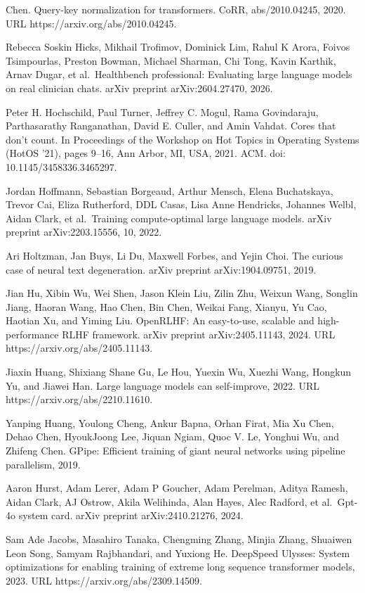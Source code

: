 Chen. Query-key normalization for transformers. CoRR, abs/2010.04245,
2020. URL https://arxiv.org/abs/2010.04245.

Rebecca Soskin Hicks, Mikhail Trofimov, Dominick Lim, Rahul K Arora,
Foivos Tsimpourlas, Preston Bowman, Michael Sharman, Chi Tong, Kavin
Karthik, Arnav Dugar, et al.~Healthbench professional: Evaluating large
language models on real clinician chats. arXiv preprint
arXiv:2604.27470, 2026.

Peter H. Hochschild, Paul Turner, Jeffrey C. Mogul, Rama Govindaraju,
Parthasarathy Ranganathan, David E. Culler, and Amin Vahdat. Cores that
don't count. In Proceedings of the Workshop on Hot Topics in Operating
Systems (HotOS '21), pages 9--16, Ann Arbor, MI, USA, 2021. ACM. doi:
10.1145/3458336.3465297.

Jordan Hoffmann, Sebastian Borgeaud, Arthur Mensch, Elena Buchatskaya,
Trevor Cai, Eliza Rutherford, DDL Casas, Lisa Anne Hendricks, Johannes
Welbl, Aidan Clark, et al.~Training compute-optimal large language
models. arXiv preprint arXiv:2203.15556, 10, 2022.

Ari Holtzman, Jan Buys, Li Du, Maxwell Forbes, and Yejin Choi. The
curious case of neural text degeneration. arXiv preprint
arXiv:1904.09751, 2019.

Jian Hu, Xibin Wu, Wei Shen, Jason Klein Liu, Zilin Zhu, Weixun Wang,
Songlin Jiang, Haoran Wang, Hao Chen, Bin Chen, Weikai Fang, Xianyu, Yu
Cao, Haotian Xu, and Yiming Liu. OpenRLHF: An easy-to-use, scalable and
high-performance RLHF framework. arXiv preprint arXiv:2405.11143, 2024.
URL https://arxiv.org/abs/2405.11143.



Jiaxin Huang, Shixiang Shane Gu, Le Hou, Yuexin Wu, Xuezhi Wang, Hongkun
Yu, and Jiawei Han. Large language models can self-improve, 2022. URL
https://arxiv.org/abs/2210.11610.

Yanping Huang, Youlong Cheng, Ankur Bapna, Orhan Firat, Mia Xu Chen,
Dehao Chen, HyoukJoong Lee, Jiquan Ngiam, Quoc V. Le, Yonghui Wu, and
Zhifeng Chen. GPipe: Efficient training of giant neural networks using
pipeline parallelism, 2019.

Aaron Hurst, Adam Lerer, Adam P Goucher, Adam Perelman, Aditya Ramesh,
Aidan Clark, AJ Ostrow, Akila Welihinda, Alan Hayes, Alec Radford, et
al.~Gpt-4o system card. arXiv preprint arXiv:2410.21276, 2024.

Sam Ade Jacobs, Masahiro Tanaka, Chengming Zhang, Minjia Zhang, Shuaiwen
Leon Song, Samyam Rajbhandari, and Yuxiong He. DeepSpeed Ulysses: System
optimizations for enabling training of extreme long sequence transformer
models, 2023. URL https://arxiv.org/abs/2309.14509.

